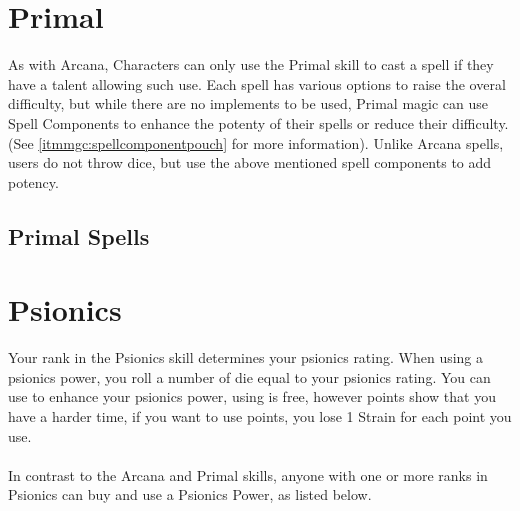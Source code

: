 \begin{multicols}{2}

\section{Primal}

As with Arcana, Characters can only use the Primal skill to cast a spell if they
have a talent allowing such use. Each spell has various options to raise the overal
difficulty, but while there are no implements to be used, Primal magic can use Spell
Components to enhance the potenty of their spells or reduce their difficulty.
(See \cref{itmmgc:spellcomponentpouch} for more information). Unlike Arcana spells,
users do not throw \force dice, but use the above mentioned spell components to add potency.

\subsection{Primal Spells}





\FloatBarrier

\section{Psionics}
Your rank in the Psionics skill determines your psionics rating.
When using a psionics power, you roll a number of \force die equal to your
psionics rating. You can use \darklight to enhance your psionics power,
using \light is free, however \dark points show that you have a harder time,
if you want to use \dark points, you lose 1 Strain for each \dark point you
use.\\
\\
In contrast to the Arcana and Primal skills, anyone with one or more ranks
in Psionics can buy and use a Psionics Power, as listed below.\\

\end{multicols}
\newpage

%


%
%

%

%

%
